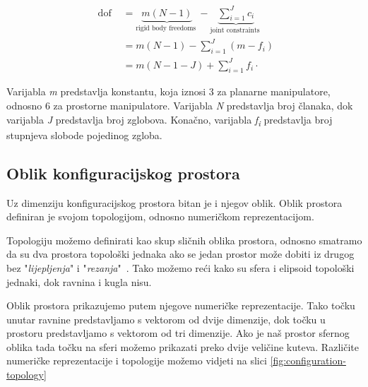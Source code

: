 \documentclass[times, utf8, diplomskirad]{fer}
\begin{document}
\begin{equation}
    \begin{aligned}
        \text { dof } &=\underbrace{m(N-1)}_{\text {rigid body freedoms }}-\underbrace{\sum_{i=1}^{J} c_{i}}_{\text {joint constraints }} \\
        &=m(N-1)-\sum_{i=1}^{J}\left(m-f_{i}\right) \\
        &=m(N-1-J)+\sum_{i=1}^{J} f_{i} \cdot
    \end{aligned}
    \label{eq:grubler}
\end{equation}

Varijabla \textit{m} predstavlja konstantu, koja iznosi 3 za planarne manipulatore, odnosno 6 za prostorne manipulatore.
Varijabla \textit{N} predstavlja broj članaka, dok varijabla \textit{J} predstavlja broj zglobova.
Konačno, varijabla \textit{f\textsubscript{i}} predstavlja broj stupnjeva slobode pojedinog zgloba.

\subsection{Oblik konfiguracijskog prostora}
Uz dimenziju konfiguracijskog prostora bitan je i njegov oblik.
Oblik prostora definiran je svojom topologijom, odnosno numeričkom reprezentacijom.

Topologiju možemo definirati kao skup sličnih oblika prostora, odnosno smatramo da su dva prostora topološki jednaka
ako se jedan prostor može dobiti iz drugog bez "\textit{lijepljenja}" i "\textit{rezanja}"~\cite{10.5555/3165183}.
Tako možemo reći kako su sfera i elipsoid topološki jednaki, dok ravnina i kugla nisu.

Oblik prostora prikazujemo putem njegove numeričke reprezentacije.
Tako točku unutar ravnine predstavljamo s vektorom od dvije dimenzije, dok točku u prostoru predstavljamo s vektorom od tri dimenzije.
Ako je naš prostor sfernog oblika tada točku na sferi možemo prikazati preko dvije veličine kuteva.
Različite numeričke reprezentacije i topologije možemo vidjeti na slici \ref{fig:configuration-topology}
\end{document}
